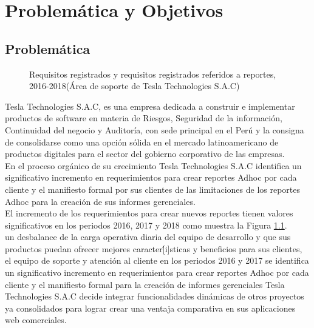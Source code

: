 \chapter{Problemática y Objetivos} \label{chapter:I}
\section{Problem\'{a}tica}
\begin{spacing}{1.5}
		\begin{figure}[h]\label{figure:chaperI_1}
			\begin{center}
				\tikzI
			\end{center}
			\caption {\centering \small{Requisitos registrados y requisitos registrados referidos a reportes,  2016-2018(\'{A}rea de soporte de Tesla Technologies S.A.C)}} 
		\end{figure}
	Tesla Technologies S.A.C, es una empresa dedicada a construir e implementar productos de software en materia de Riesgos, Seguridad de la información, Continuidad del negocio y Auditoría, con sede principal en el Perú y la consigna de consolidarse como una opci\'{o}n s\'{o}lida en el mercado latinoamericano de productos digitales para el sector del gobierno corporativo de las empresas.\\	                         
	En el proceso org\'{a}nico de su crecimiento Tesla Technologies S.A.C  identifica un significativo incremento en requerimientos para crear reportes Adhoc por cada cliente y el manifiesto formal por sus clientes de las limitaciones de los reportes Adhoc para la creación de sus informes gerenciales.\\
	El incremento de los requerimientos para crear nuevos reportes tienen valores significativos en los periodos 2016, 2017 y 2018 como muestra la Figura \ref{figure:chaperI_1}.\\	
	un desbalance de la carga operativa diaria del equipo de desarrollo y que sus productos puedan ofrecer mejores caracter\'[i]sticas y beneficios para sus clientes, el equipo de soporte y atenci\'{o}n al cliente  en los periodos 2016 y 2017 se identifica un significativo incremento en requerimientos para crear reportes Adhoc por cada cliente y el manifiesto formal   para la creación de informes gerenciales Tesla Technologies S.A.C decide integrar funcionalidades dinámicas de otros proyectos ya consolidados para lograr crear una ventaja comparativa en sus aplicaciones web comerciales.

\end{spacing}
